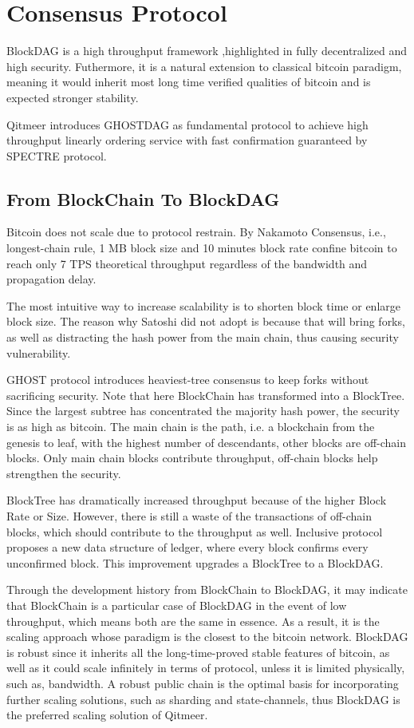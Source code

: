 \documentclass[a4paper,11pt]{article}
\begin{document}
\section{Consensus Protocol}

BlockDAG is a high throughput framework ,highlighted in fully decentralized and high security. Futhermore, it is a natural extension to classical bitcoin paradigm, meaning it would inherit most  long time verified qualities of bitcoin and is expected stronger stability.

Qitmeer introduces GHOSTDAG as fundamental protocol to achieve high throughput linearly ordering service with fast confirmation guaranteed by SPECTRE protocol.

\subsection{From BlockChain To BlockDAG}
Bitcoin does not scale due to protocol restrain. By Nakamoto Consensus, i.e., longest-chain rule, 1 MB block size and 10 minutes block rate confine bitcoin to reach only 7 TPS theoretical throughput regardless of the bandwidth and propagation delay.

The most intuitive way to increase scalability is to shorten block time or enlarge block size. The reason why Satoshi did not adopt is because that will bring forks, as well as distracting the hash power from the main chain, thus causing security vulnerability.

GHOST protocol introduces heaviest-tree consensus to keep forks without sacrificing security. Note that here BlockChain has transformed into a BlockTree. Since the largest subtree has concentrated the majority hash power, the security is as high as bitcoin. The main chain is the path, i.e. a blockchain from the genesis to leaf, with the highest number of descendants, other blocks are off-chain blocks. Only main chain blocks contribute throughput, off-chain blocks help strengthen the security. 

BlockTree has dramatically increased throughput because of the higher Block Rate or Size. However, there is still a waste of the transactions of off-chain blocks, which should contribute to the throughput as well. Inclusive\cite{Inclusive} protocol proposes a new data structure of ledger, where every block confirms every unconfirmed block. This improvement upgrades a BlockTree to a BlockDAG.

Through the development history from BlockChain to BlockDAG, it may indicate  that BlockChain is a particular case of BlockDAG in the event of low throughput, which means both are the same in essence. As a result,  it is the scaling approach whose paradigm is the closest to the bitcoin network. BlockDAG is robust since it inherits all the long-time-proved stable features of bitcoin,  as well as it could scale infinitely in terms of protocol, unless it is limited physically, such as, bandwidth. A robust public chain is the optimal basis for incorporating further scaling solutions, such as sharding and state-channels, thus BlockDAG is the preferred scaling solution of Qitmeer.
\end{document}
